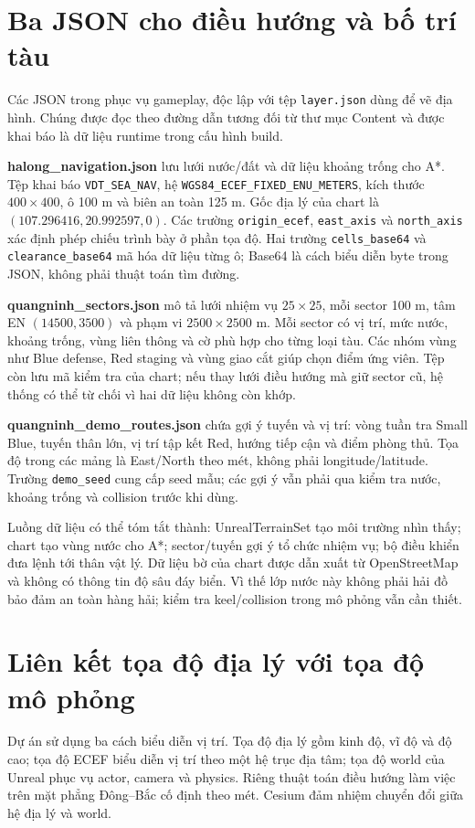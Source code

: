 \documentclass[11pt,a4paper,oneside]{report}
\begin{document}
\section{Ba JSON cho điều hướng và bố trí tàu}
Các JSON trong  phục vụ gameplay, độc lập với tệp \texttt{layer.json} dùng để vẽ địa hình. Chúng được đọc theo đường dẫn tương đối từ thư mục Content và được khai báo là dữ liệu runtime trong cấu hình build.

\textbf{halong\_navigation.json} lưu lưới nước/đất và dữ liệu khoảng trống cho A*. Tệp khai báo \texttt{VDT\_SEA\_NAV}, hệ \texttt{WGS84\_ECEF\_FIXED\_ENU\_METERS}, kích thước $400\times400$, ô 100 m và biên an toàn 125 m. Gốc địa lý của chart là $(107.296416,20.992597,0)$. Các trường \texttt{origin\_ecef}, \texttt{east\_axis} và \texttt{north\_axis} xác định phép chiếu trình bày ở phần tọa độ. Hai trường \texttt{cells\_base64} và \texttt{clearance\_base64} mã hóa dữ liệu từng ô; Base64 là cách biểu diễn byte trong JSON, không phải thuật toán tìm đường.

\textbf{quangninh\_sectors.json} mô tả lưới nhiệm vụ $25\times25$, mỗi sector 100 m, tâm EN $(14500,3500)$ và phạm vi $2500\times2500$ m. Mỗi sector có vị trí, mức nước, khoảng trống, vùng liên thông và cờ phù hợp cho từng loại tàu. Các nhóm vùng như Blue defense, Red staging và vùng giao cắt giúp chọn điểm ứng viên. Tệp còn lưu mã kiểm tra của chart; nếu thay lưới điều hướng mà giữ sector cũ, hệ thống có thể từ chối vì hai dữ liệu không còn khớp.

\textbf{quangninh\_demo\_routes.json} chứa gợi ý tuyến và vị trí: vòng tuần tra Small Blue, tuyến thân lớn, vị trí tập kết Red, hướng tiếp cận và điểm phòng thủ. Tọa độ trong các mảng là East/North theo mét, không phải longitude/latitude. Trường \texttt{demo\_seed} cung cấp seed mẫu; các gợi ý vẫn phải qua kiểm tra nước, khoảng trống và collision trước khi dùng.

Luồng dữ liệu có thể tóm tắt thành: UnrealTerrainSet tạo môi trường nhìn thấy; chart tạo vùng nước cho A*; sector/tuyến gợi ý tổ chức nhiệm vụ; bộ điều khiển đưa lệnh tới thân vật lý. Dữ liệu bờ của chart được dẫn xuất từ OpenStreetMap và không có thông tin độ sâu đáy biển. Vì thế lớp nước này không phải hải đồ bảo đảm an toàn hàng hải; kiểm tra keel/collision trong mô phỏng vẫn cần thiết.

\section{Liên kết tọa độ địa lý với tọa độ mô phỏng}
Dự án sử dụng ba cách biểu diễn vị trí. Tọa độ địa lý gồm kinh độ, vĩ độ và độ cao; tọa độ ECEF biểu diễn vị trí theo một hệ trục địa tâm; tọa độ world của Unreal phục vụ actor, camera và physics. Riêng thuật toán điều hướng làm việc trên mặt phẳng Đông--Bắc cố định theo mét. Cesium đảm nhiệm chuyển đổi giữa hệ địa lý và world.\cite{cesium}
\end{document}
